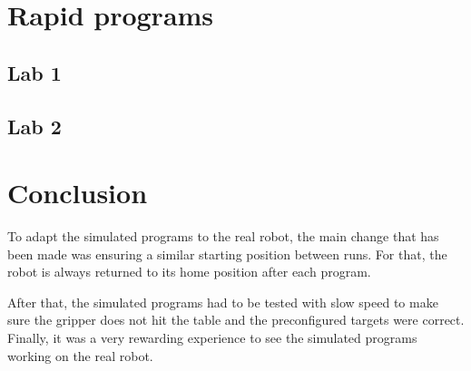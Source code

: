 \section {Rapid programs}
\subsection{Lab 1}


\subsection{Lab 2}


\section{Conclusion}
To adapt the simulated programs to the real robot, the main change that has been made was ensuring a similar starting position between runs.
For that, the robot is always returned to its home position after each program.
\par
After that, the simulated programs had to be tested with slow speed to make sure the gripper does not hit the table and the preconfigured targets were correct.
\newline
Finally, it was a very rewarding experience to see the simulated programs working on the real robot. 

